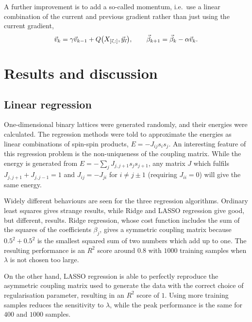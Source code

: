 \documentclass[11pt,british,a4paper]{article}
\numberwithin{equation}{section}
\begin{document}
A further improvement is to add a so-called momentum, i.e.\ use a linear combination of the current and previous gradient rather than just using the current gradient,
\begin{equation}
    \vec{v}_{k} = \gamma \vec{v}_{k-1} + Q\qty(X_{\qty[\vec{\imath},:]},\vec{y}_{\vec{\imath}}), \qquad
    \vec{\beta}_{k+1} = \vec{\beta}_k - \alpha\vec{v}_k.
\end{equation}

\section{Results and discussion}
\subsection{Linear regression}\label{subsec:linregresults}
One-dimensional binary lattices were generated randomly, and their energies were calculated.
The regression methods were told to approximate the energies as linear combinations of spin-spin products, \(E=-J_{ij}s_i s_j\).
An interesting feature of this regression problem is the non-uniqueness of the coupling matrix.
While the energy is generated from \(E=-\sum_j J_{j,j+1}s_j s_{j+1}\), any matrix \(J\) which fulfils \(J_{j,j+1} + J_{j,j-1}=1\) and \(J_{ij} = -J_{ji}\) for \(i\neq j\pm1\) (requiring \(J_{ii}=0\)) will give the same energy.

Widely different behaviours are seen for the three regression algorithms.
Ordinary least squares gives strange results, while Ridge and LASSO regression give good, but different, results.
Ridge regression, whose cost function includes the sum of the squares of the coefficients \(\beta_j\), gives a symmetric coupling matrix because \(\num{0.5}^2+\num{0.5}^2\) is the smallest squared sum of two numbers which add up to one.
The resulting performance is an \(R^2\) score around \(\num{0.8}\) with \(\num{1000}\) training samples when \(\lambda\) is not chosen too large.

On the other hand, LASSO regression is able to perfectly reproduce the asymmetric coupling matrix used to generate the data with the correct choice of regularisation parameter, resulting in an \(R^2\) score of \(1\). Using more training samples reduces the sensitivity to \(\lambda\), while the peak performance is the same for \(\num{400}\) and \(\num{1000}\) samples.
\end{document}
